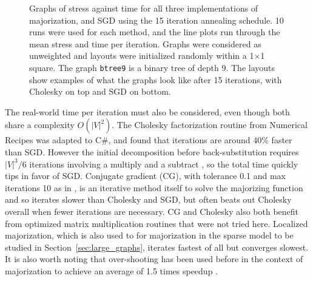 \begin{figure}
  \centering
  \caption[Stress measured on a further selection of graphs]{Graphs of stress against time for all three implementations of majorization, and SGD using the 15 iteration annealing schedule. 10 runs were used for each method, and the line plots run through the mean stress and time per iteration.
  Graphs were considered as unweighted
  and layouts were initialized randomly within a 1$\times$1 square.
  The graph \texttt{btree9} is a binary tree of depth 9. 
  The layouts show examples of what the graphs look like after 15 iterations, with Cholesky on top and SGD on bottom.
  }
  \label{fig:stress_plots_big}
\end{figure}

The real-world time per iteration must also be considered, even though both share a complexity $O(|V|^2)$. The Cholesky factorization routine from Numerical Recipes \cite{Press2007Cholesky} was adapted to C\#, and found that iterations are around 40\% faster than SGD. However the initial decomposition before back-substitution requires $|V|^3/6$ iterations involving a multiply and a subtract \cite{Press2007Cholesky}, so the total time quickly tips in favor of SGD.
Conjugate gradient (CG), with tolerance 0.1 and max iterations 10 as in \cite{Gansner2013}, is an iterative method itself to solve the majorizing function and so iterates slower than Cholesky and SGD, but often beats out Cholesky overall when fewer iterations are necessary.
CG and Cholesky also both benefit from optimized matrix multiplication routines \cite{Gansner2004} that were not tried here.
Localized majorization, which is also used to for majorization in the sparse model to be studied in Section~\ref{sec:large_graphs}, iterates fastest of all but converges slowest.
It is also worth noting that over-shooting has been used before in the context of majorization to achieve an average of 1.5 times speedup \cite{Wang2012}.

